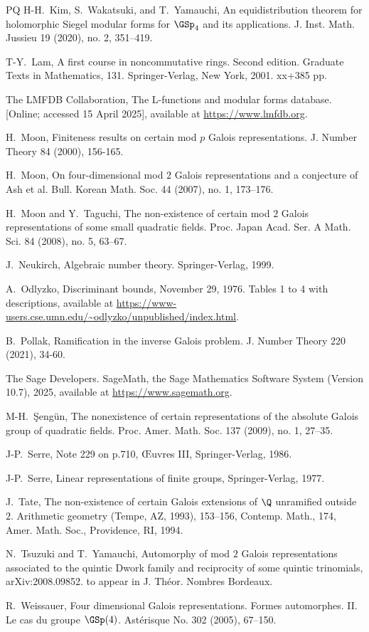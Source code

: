 \begin{thebibliography}{PQ}
  H-H.~Kim, S.~Wakatsuki, and T.~Yamauchi, An equidistribution theorem for holomorphic Siegel modular forms for $\GSp_4$ and its applications. J. Inst. Math. Jussieu 19 (2020), no. 2, 351–419.

  T-Y.~Lam, A first course in noncommutative rings. Second edition. Graduate Texts in Mathematics, 131. Springer-Verlag, New York, 2001. xx+385 pp.

  The LMFDB Collaboration, The L-functions and modular forms database. [Online; accessed 15 April 2025], available at \url{https://www.lmfdb.org}.

  H.~Moon, Finiteness results on certain mod $p$ Galois representations. J. Number Theory 84 (2000), 156-165.

  H.~Moon, On four-dimensional mod $2$ Galois representations and a conjecture of Ash et al. Bull. Korean Math. Soc. 44 (2007), no. 1, 173–176.

  H.~Moon and Y.~Taguchi, The non-existence of certain mod $2$ Galois representations of some small quadratic fields. Proc. Japan Acad. Ser. A Math. Sci. 84 (2008), no. 5, 63–67.

  J.~Neukirch, Algebraic number theory. Springer-Verlag, 1999.

  A.~Odlyzko, Discriminant bounds, November 29, 1976. Tables 1 to 4 with descriptions,
  available at \url{https://www-users.cse.umn.edu/~odlyzko/unpublished/index.html}.

  B.~Pollak, Ramification in the inverse Galois problem. J. Number Theory 220 (2021), 34-60.

  The Sage Developers. SageMath, the Sage Mathematics Software System (Version 10.7),
  2025, available at \url{https://www.sagemath.org}.

  M-H.~Şeng\"un,
  The nonexistence of certain representations of the absolute Galois group of quadratic fields.
  Proc. Amer. Math. Soc. 137 (2009), no. 1, 27–35.


  J-P.~Serre, Note 229 on p.710, \OE{}uvres III, Springer-Verlag, 1986.

  J-P.~Serre, Linear representations of finite groups, Springer-Verlag, 1977.

  J.~Tate, The non-existence of certain Galois extensions of $\Q$ unramified outside $2$. Arithmetic geometry (Tempe, AZ, 1993), 153–156, Contemp. Math., 174, Amer. Math. Soc., Providence, RI, 1994.

  N.~Tsuzuki and T.~Yamauchi, Automorphy of mod $2$ Galois representations associated to the quintic Dwork family and reciprocity of some quintic trinomials,
  arXiv:2008.09852. to appear in J. Th\'eor. Nombres Bordeaux.

  R.~Weissauer, Four dimensional Galois representations. Formes automorphes. II. Le cas du groupe $\GSp(4)$. Ast\'erisque No. 302 (2005), 67–150.



\end{thebibliography}
